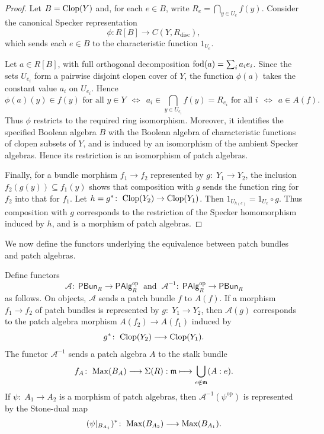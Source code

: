 \documentclass[11pt]{amsart}
\begin{document}
\begin{proof}
Let $B=\mbox{\rm Clop}(Y)$ and, for each $e\in B$, write $R_e=\bigcap_{y\in U_e}f(y)$.
Consider the canonical Specker representation
\[
\phi\colon R[B]\longrightarrow C(Y,R_{\mathrm{disc}}),
\]
which sends each $e\in B$ to the characteristic
function $1_{U_e}$.

Let $a\in R[B]$, with full orthogonal decomposition $\mbox{\rm fod}(a)=\sum_i a_i e_i$. Since the sets $U_{e_i}$ form a pairwise disjoint
clopen cover of $Y$, the function $\phi(a)$ takes the constant value $a_i$ on $U_{e_i}$. Hence
$$
\phi(a)(y)\in f(y)\text{ for all }y\in Y
\:\:\Longleftrightarrow\:\:
a_i\in\bigcap_{y\in U_{e_i}}f(y)=R_{e_i}\text{ for all }i
\:\: \Longleftrightarrow\:\:a\in A(f).
$$
Thus $\phi$ restricts to the required ring isomorphism. Moreover, it identifies the specified Boolean algebra $B$ with the Boolean
algebra of characteristic functions of clopen subsets of $Y$, and is induced by an isomorphism of the ambient Specker algebras. Hence its
restriction is an isomorphism of patch algebras.

Finally, for a bundle morphism $f_1\to f_2$ represented by $g\colon\; Y_1\to Y_2$, the inclusion $f_2(g(y))\subseteq f_1(y)$ shows that composition with $g$ sends the function ring for $f_2$ into that for $f_1$. Let $h=g^*\colon\; \mbox{\rm Clop}(Y_2)\to\mbox{\rm Clop}(Y_1)$. Then
$1_{U_{h(e)}}=1_{U_e}\circ g.$ Thus composition with $g$ corresponds to the restriction of the Specker homomorphism induced by $h$, and is a morphism of patch algebras.
\end{proof}

We now define the functors underlying  the equivalence between patch bundles and patch algebras.

\begin{definition}\label{rem: PAlg PBundle}
Define functors
\[
\mathcal A\colon\; \mathsf{PBun}_R\longrightarrow\mathsf{PAlg}_R^{\mathrm{op}}
\: \text{ and } \:
\mathcal A^{-1}\colon\; \mathsf{PAlg}_R^{\mathrm{op}}\longrightarrow\mathsf{PBun}_R
\]
as follows.  On objects, $\mathcal A$ sends a patch bundle $f$ to $A(f)$. If a morphism $f_1\to f_2$ of patch bundles is represented by $g\colon\; Y_1\to Y_2$, then $\mathcal A(g)$ corresponds to the patch algebra morphism $A(f_2)\to A(f_1)$ induced by
\[
g^*\colon\; \mbox{\rm Clop}(Y_2)\longrightarrow\mbox{\rm Clop}(Y_1).
\]
The functor $\mathcal A^{-1}$ sends a patch algebra $A$ to the stalk bundle
\[
f_A\colon\; \mbox{\rm Max}(B_A)\longrightarrow\Sigma(R) :
\mathfrak m\longmapsto\bigcup_{e\notin\mathfrak m}(A:e).
\]
If $\psi\colon\; A_1\to A_2$ is a morphism of patch algebras, then $\mathcal A^{-1}(\psi^{\mathrm{op}})$ is represented by the Stone-dual map
\[
(\psi|_{B_{A_1}})^*\colon\; \mbox{\rm Max}(B_{A_2})\longrightarrow\mbox{\rm Max}(B_{A_1}).
\]
\end{definition}
\end{document}
